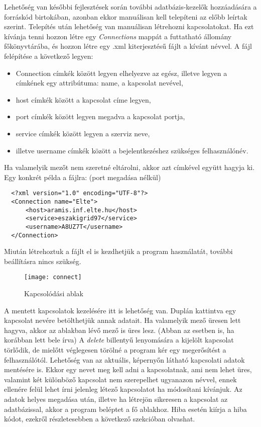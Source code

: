 Lehetőség van későbbi fejlesztések során további adatbázis-kezelők hozzáadására a forráskód birtokában, azonban ekkor
manuálisan kell telepíteni az előbb leírtak szerint.
Telepítés után lehetőség van manuálisan létrehozni kapcsolatokat. Ha ezt kívánja tenni hozzon létre egy
\textit{Connections} mappát a futtatható állomány főkönyvtárába, és hozzon létre egy .xml kiterjesztésű fájlt a kívánt névvel.
A fájl felépítése a következő legyen:
\begin{itemize}
  \item Connection címkék között legyen elhelyezve az egész, illetve legyen a címkének egy attribútuma: name, a kapcsolat nevével,
  \item host címkék között a kapcsolat címe legyen,
  \item port címkék között legyen megadva a kapcsolat portja,
  \item service címkék között legyen a szerviz neve,
  \item illetve username címkék között a bejelentkezéshez szükséges felhasználónév.
\end{itemize}
Ha valamelyik mezőt nem szeretné eltárolni, akkor azt címkével együtt hagyja ki.
Egy konkrét példa a fájlra: (port megadása nélkül)

\begin{lstlisting}
  <?xml version="1.0" encoding="UTF-8"?>
  <Connection name="Elte">
      <host>aramis.inf.elte.hu</host>
      <service>eszakigrid97</service>
      <username>A8UZ7T</username>
  </Connection>
\end{lstlisting}

Miután létrehoztuk a fájlt el is kezdhetjük a program használatát, további beállításra nincs szükség.
\begin{figure}[ht]
  \begin{center}
  \texttt{[image: connect]}
  \end{center}
 \caption{Kapcsolódási ablak}
\end{figure}
A mentett kapcsolatok kezelésére itt is lehetőség van. 
Duplán kattintva egy kapcsolat nevére betölthetjük annak adatait. Ha valamelyik mező üresen lett hagyva,
akkor az ablakban lévő mező is üres lesz. (Abban az esetben is, ha korábban lett bele írva)
A \textit{delete} billentyű lenyomására a kijelölt kapcsolat törlődik, de
mielőtt véglegesen törölné a program kér egy megerősítést a felhasználótól.
Lehetőség van az aktuális, képernyőn látható kapcsolati adatok mentésére is. Ekkor egy nevet meg kell adni a kapcsolatnak, ami nem lehet üres,
valamint két különböző kapcsolat nem szerepelhet ugyanazon névvel, ennek ellenére felül lehet írni jelenleg létező kapcsolatot ha módosítani
kívánjuk.
Az adatok helyes megadása után, illetve ha létrejön sikeresen a kapcsolat az adatbázissal, akkor a program beléptet a fő ablakhoz.
Hiba esetén kiírja a hiba kódot, ezekről részletesebben a következő szekcióban olvashat.

